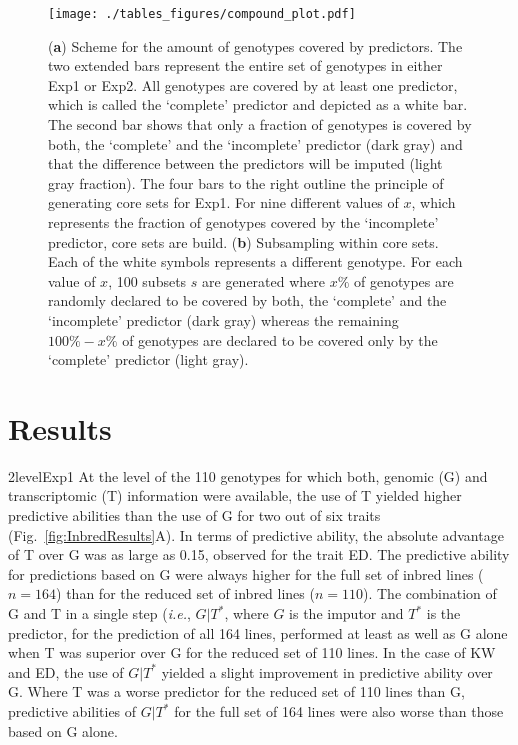 \documentclass[12pt,titlepage]{article}
\begin{document}
\begin{figure}[H]
  \centering
  \texttt{[image: ./tables\_figures/compound\_plot.pdf]}
  \caption{
  (\textbf{a}) Scheme for the amount of genotypes covered by predictors.
  The two extended bars represent the entire set of genotypes in either
  Exp1 or Exp2.
  All genotypes are covered by at least one predictor, which is called the
  `complete' predictor and depicted as a white bar.
  The second bar shows that only a fraction of genotypes is covered by both,
  the `complete' and the `incomplete' predictor (dark gray) and that the
  difference between the predictors will be imputed (light gray fraction).
  The four bars to the right outline the principle of generating core sets for
  Exp1.
  For nine different values of $x$, which represents the fraction of genotypes
  covered by the `incomplete' predictor, core sets are build.
  (\textbf{b}) Subsampling within core sets.
  Each of the white symbols represents a different genotype.
  For each value of $x$, 100 subsets $s$ are generated where $x\%$ of genotypes
  are randomly declared to be covered by both, the `complete' and the
  `incomplete' predictor (dark gray) whereas the remaining $100\% - x\%$ of
  genotypes are declared to be covered only by the `complete' predictor (light
  gray).
  }
\label{fig:compound-plot}
\end{figure}



\section*{Results}
\Genetics2level{Exp1}
At the level of the 110 genotypes for which both, genomic (G) and 
transcriptomic (T) information were available, the use of T yielded higher
predictive abilities than the use of G for two out of six traits
(Fig.~\ref{fig:InbredResults}A).
In terms of predictive ability, the absolute advantage of T over G was as large 
as 0.15, observed for the trait ED\@.
The predictive ability for predictions based on G were always higher for the
full set of inbred lines ($n = 164$) than for the reduced set of inbred lines
($n = 110$).
The combination of G and T in a single step (\textit{i.e.}, $G|T^{*}$, where
$G$ is the imputor and $T^{*}$ is the predictor, for the prediction of all 164
lines, performed at least as well as G alone when T was superior over G for the
reduced set of 110 lines.
In the case of KW and ED, the use of $G|T^{*}$ yielded a slight improvement in
predictive ability over G.
Where T was a worse predictor for the reduced set of 110 lines than G,
predictive abilities of $G|T^{*}$ for the full set of 164 lines were also worse
than those based on G alone.
\end{document}

